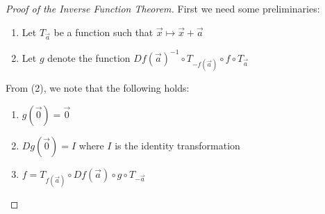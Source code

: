 \documentclass[15pt]{book}
\theoremstyle{break}
\theoremstyle{break}
\begin{document}
\begin{proof}[Proof of the Inverse Function Theorem]
\hfill\break First we need some preliminaries:\begin{enumerate}[topsep=3pt,itemsep=-1ex,partopsep=1ex,parsep=1ex]
\item Let $T_{\vec{a}}$ be a function such that $\vec{x} \mapsto \vec{x}+\vec{a}$
\item Let $g$ denote the function $Df(\vec{a})^{-1}\circ T_{-f(\vec{a})} \circ f\circ T_{\vec{a}}$
\end{enumerate}

From (2), we note that the following holds:
\begin{enumerate}[topsep=3pt,itemsep=-1ex,partopsep=1ex,parsep=1ex]
\item $g(\vec{0}) = \vec{0}$
\item $Dg(\vec{0}) = I$ where $I$ is the identity transformation
\item $f = T_{f(\vec{a})}\circ Df(\vec{a})\circ g\circ T_{-\vec{a}}$
\end{enumerate}


\end{proof}
\end{document}
